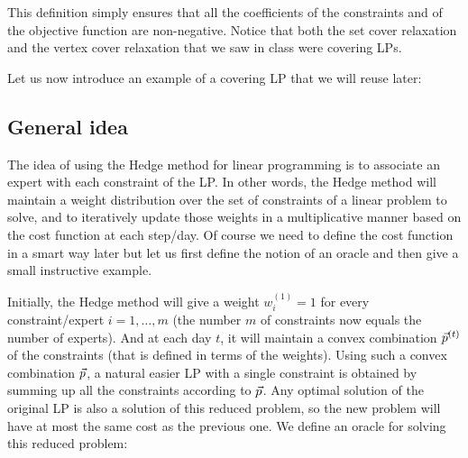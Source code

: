 This definition simply ensures that all the coefficients of the constraints and of the objective
function are non-negative. Notice that both the set cover relaxation and the vertex cover
relaxation that we saw in class were covering LPs.

Let us now introduce an example of a covering LP that we will reuse later:
\label{ex:cov}

\subsection{General idea}

The idea of using the Hedge method for linear programming is to associate an expert with each
constraint of the LP. In other words, the Hedge method will maintain a weight distribution over the
set of constraints of a linear problem to solve, and to iteratively update those weights in a
multiplicative manner based on the cost function at each step/day. Of course we need to define the
cost function in a smart way later but let us first define the notion of an oracle and then give a
small instructive example.

Initially, the Hedge method will give a weight $w_i^{(1)}=1$ for every constraint/expert
$i=1,\ldots,m$ (the number $m$ of constraints now equals the number of experts). And at each day
$t$, it will maintain a convex combination $\vec{p}^{(t)}$ of the constraints (that is defined in terms
of the weights). Using such a convex combination $\vec{p}$, a natural easier LP with a single
constraint is obtained by summing up all the constraints according to $\vec{p}$. Any optimal solution
of the original LP is also a solution of this reduced problem, so the new problem will have at most
the same cost as the previous one. We define an oracle for solving this reduced problem:


